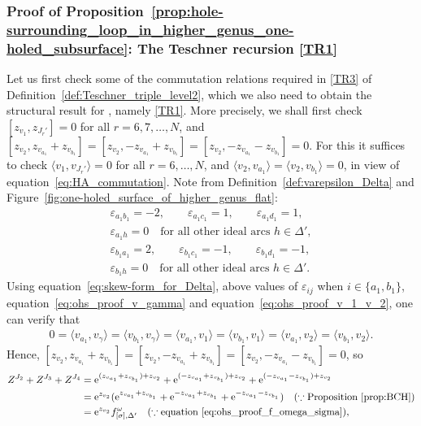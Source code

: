 \documentclass[10pt,a4paper]{amsart}
\numberwithin{equation}{section}
\theoremstyle{definition}
\begin{document}
\subsubsection{Proof of Proposition~\ref{prop:hole-surrounding_loop_in_higher_genus_one-holed_subsurface}: The Teschner recursion \ref{TR1}}
Let us first check some of the commutation relations required in \ref{TR3} of Definition~\ref{def:Teschner_triple_level2}, which we also need to obtain the structural result for , namely \ref{TR1}. More precisely, we shall first check $[z_{v_1}, z_{J_r'}]=0$ for all $r=6,7,\dots,N$, and $[z_{v_2}, z_{v_{a_1}}+ z_{v_{b_1}}] = [z_{v_2}, -z_{v_{a_1}} + z_{v_{b_1}}] = [z_{v_2}, - z_{v_{a_1}}- z_{v_{b_1}}]=0$. For this it suffices to check $\langle v_1,v_{J_r'}\rangle=0$ for all $r=6,\dots,N$, and $\langle v_2, v_{a_1} \rangle = \langle v_2, v_{b_1}\rangle=0$, in view of equation~\eqref{eq:HA_commutation}. Note from Definition~\ref{def:varepsilon_Delta} and Figure~\ref{fig:one-holed_surface_of_higher_genus_flat}:
\begin{gather}
\varepsilon_{a_1 b_1} = - 2, \qquad
\varepsilon_{a_1 c_1} = 1, \qquad
\varepsilon_{a_1 d_1} = 1, \nonumber\\
\varepsilon_{a_1 h} = 0 \quad \mbox{for all other ideal arcs $h \in \Delta'$}, \label{eq:ohs_proof_some_varepsilon1}\\
\varepsilon_{b_1 a_1} = 2, \qquad
\varepsilon_{b_1 c_1} = -1, \qquad
\varepsilon_{b_1 d_1} = -1, \nonumber\\
\varepsilon_{b_1 h} =0 \quad \mbox{for all other ideal arcs $h\in \Delta'$}.\label{eq:ohs_proof_some_varepsilon2}
\end{gather}
Using equation~\eqref{eq:skew-form_for_Delta}, above values of $\varepsilon_{ij}$ when $i\in \{a_1,b_1\}$, equation~\eqref{eq:ohs_proof_v_gamma} and equation~\eqref{eq:ohs_proof_v_1_v_2}, one can verify that
\begin{align}
\label{eq:ohs_proof_some_commutations1}
0 = \langle v_{a_1}, v_\gamma \rangle
= \langle v_{b_1}, v_\gamma \rangle
= \langle v_{a_1}, v_1\rangle
= \langle v_{b_1}, v_1\rangle
= \langle v_{a_1}, v_2 \rangle
= \langle v_{b_1}, v_2 \rangle.
\end{align}
Hence, $[z_{v_2}, z_{v_{a_1}}+ z_{v_{b_1}}] = [z_{v_2}, -z_{v_{a_1}} + z_{v_{b_1}}] = [z_{v_2}, - z_{v_{a_1}}- z_{v_{b_1}}]=0$, so
\begin{align*}
Z^{J_2} + Z^{J_3} + Z^{J_4}
& = {\rm e}^{(z_{v_{a_1}} + z_{v_{b_1}}) + z_{v_2}}
+ {\rm e}^{(-z_{v_{a_1}} + z_{v_{b_1}}) + z_{v_2}}
+ {\rm e}^{(-z_{v_{a_1}} - z_{v_{b_1}}) + z_{v_2}} \\
& = {\rm e}^{z_{v_2}}( {\rm e}^{z_{v_{a_1}} + z_{v_{b_1}}}
+ {\rm e}^{-z_{v_{a_1}} + z_{v_{b_1}}}
+ {\rm e}^{-z_{v_{a_1}} - z_{v_{b_1}}}) \quad (\because \mbox{Proposition~\ref{prop:BCH}}) \\
& = {\rm e}^{z_{v_2}} f^\omega_{[\sigma],\Delta'} \quad (\because \mbox{equation~\eqref{eq:ohs_proof_f_omega_sigma}}),
\end{align*}
\end{document}
